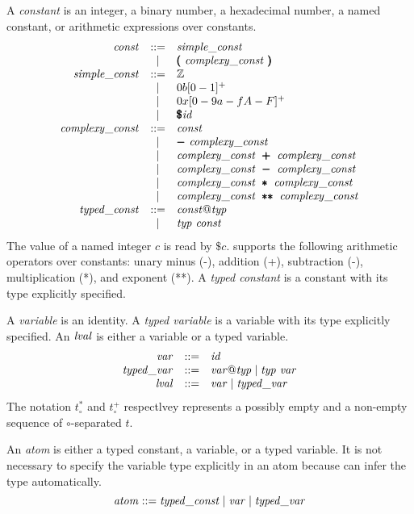 \documentclass{article}
\begin{document}
A \emph{constant} is an integer, a binary number, a hexadecimal
number, a named constant, or arithmetic expressions over constants.
\[
  \begin{array}{rcl}
    \mathit{const} &  ::= & \mathit{simple\_const} \\
           & \mid & \pmb(\ \mathit{complexy\_const}\ \pmb) \\
    \mathit{simple\_const} &  ::= & \mathbb{Z} \\
           & \mid & 0b[0-1]^+ \\
           & \mid & 0x[0-9a-fA-F]^+ \\
           & \mid & \pmb{\mathit{\$}} \mathit{id} \\
    \mathit{complexy\_const} &  ::= & \mathit{const} \\
           & \mid & \pmb{-}\ \mathit{complexy\_const} \\
           & \mid & \mathit{complexy\_const}\ \pmb{+}\ \mathit{complexy\_const} \\
           & \mid & \mathit{complexy\_const}\ \pmb{-}\ \mathit{complexy\_const} \\
           & \mid & \mathit{complexy\_const}\ \pmb{*}\ \mathit{complexy\_const} \\
           & \mid & \mathit{complexy\_const}\ \pmb{**}\ \mathit{complexy\_const} \\
    \mathit{typed\_const} & ::= & \mathit{const} @ \mathit{typ} \\
           & \mid &  \mathit{typ}\ \mathit{const}
  \end{array}
\]
The value of a named integer $c$ is read by $\$c$.
\cryptoline supports the following arithmetic operators over
constants: unary minus (-), addition (+), subtraction (-),
multiplication (*), and exponent (**).
A \emph{typed constant} is a constant with its type explicitly
specified.

A \emph{variable} is an identity.
A \emph{typed variable} is a variable with its type explicitly
specified.
An $\mathit{lval}$ is either a variable or a typed variable.
\[
  \begin{array}{rcl}
    \mathit{var} & ::= & \mathit{id} \\
    \mathit{typed\_var} & ::= & \mathit{var} @ \mathit{typ} \mid \mathit{typ}\ \mathit{var} \\
    \mathit{lval} & ::= & \mathit{var} \mid \mathit{typed\_var}
  \end{array}
\]
The notation $t_{\circ}^*$ and $t_{\circ}^+$ respectlvey represents a
possibly empty and a non-empty sequence of $\circ$-separated $t$.

An \emph{atom} is either a typed constant, a variable, or a typed
variable.
It is not necessary to specify the variable type explicitly in
an atom because \cryptoline can infer the type automatically.
\[
\mathit{atom} ::= \mathit{typed\_const} \mid \mathit{var} \mid \mathit{typed\_var}
\]
\end{document}
